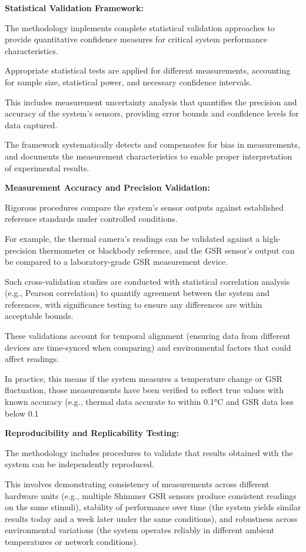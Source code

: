 \textbf{Statistical Validation Framework:}

The methodology implements complete statistical validation approaches to provide
quantitative confidence measures for critical system performance
characteristics.

Appropriate statistical tests are applied for different measurements, accounting
for sample size, statistical power, and necessary confidence intervals.

This includes measurement uncertainty analysis that quantifies the precision and
accuracy of the system's sensors, providing error bounds and confidence levels
for data captured.

The framework systematically detects and compensates for bias in measurements,
and documents the measurement characteristics to enable proper interpretation of
experimental results.

\textbf{Measurement Accuracy and Precision Validation:}

Rigorous procedures compare the system's sensor outputs against established
reference standards under controlled conditions.

For example, the thermal camera's readings can be validated against a
high-precision thermometer or blackbody reference, and the GSR sensor's output
can be compared to a laboratory-grade GSR measurement device.

Such cross-validation studies are conducted with statistical correlation
analysis (e.g., Pearson correlation) to quantify agreement between the system
and references, with significance testing to ensure any differences are within
acceptable bounds.

These validations account for temporal alignment (ensuring data from different
devices are time-synced when comparing) and environmental factors that could
affect readings.

In practice, this means if the system measures a temperature change or GSR
fluctuation, those measurements have been verified to reflect true values with
known accuracy (e.g., thermal data accurate to within 0.1°C and GSR data loss
below 0.1%

\textbf{Reproducibility and Replicability Testing:}

The methodology includes procedures to validate that results obtained with the
system can be independently reproduced.

This involves demonstrating consistency of measurements across different
hardware units (e.g., multiple Shimmer GSR sensors produce consistent readings
on the same stimuli), stability of performance over time (the system yields
similar results today and a week later under the same conditions), and
robustness across environmental variations (the system operates reliably in
different ambient temperatures or network conditions).

